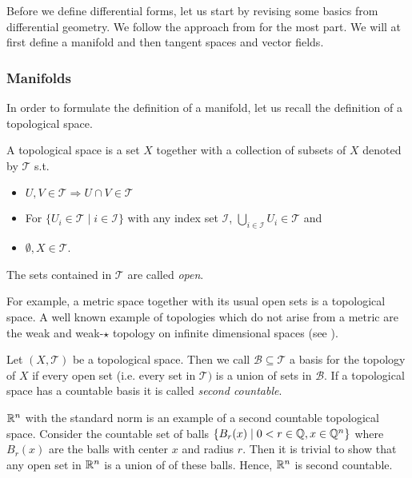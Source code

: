 \documentclass[../master_thesis.tex]{subfiles}
\begin{document}
Before we define differential forms, let us start by revising some basics
from differential geometry. We follow the approach from 
\cite[Sec. II]{topology_and_geometry} for the most part. We will at first define 
a manifold and then tangent spaces and vector fields.

\subsubsection{Manifolds}

In order to formulate the definition of a manifold, let us recall the 
definition of a topological space.
\begin{definition}
    A topological space is a set $X$ together with a collection of subsets of 
    $X$ denoted by $\mathcal{T}$ s.t.
    \begin{itemize}
        \item $U,V \in \mathcal{T} \Rightarrow U \cap V \in \mathcal{T}$
        \item For $\{ U_i \in \mathcal{T} \mid i \in \mathcal{I} \}$
            with any index set $\mathcal{I}$, 
            $\bigcup_{i\in \mathcal{I}} U_i \in \mathcal{T}$ and
        \item $\emptyset, X \in \mathcal{T}$.
    \end{itemize}
    The sets contained in $\mathcal{T}$ are called \textit{open}.
\end{definition}
For example, a metric space together with its usual open sets is a topological
space. A well known example of topologies which do not arise from a metric
are the weak and weak-$\star$ topology on infinite dimensional spaces
(see \cite[Ch.\,3]{brezis}).

\begin{definition}
    Let $(X,\mathcal{T})$ be a topological space. Then we call 
    $\mathcal{B}\subseteq \mathcal{T}$ a basis for the topology of $X$ if 
    every open set (i.e. every set in $\mathcal{T})$ is a union of sets 
    in $\mathcal{B}$. If a topological space has a countable basis it is called
    \textit{second countable}.
\end{definition}
$\mathbb{R}^n$ with the standard norm is an example of a second countable topological space. Consider 
the countable set of balls $\{ B_r(x) \mid 0 < r \in \mathbb{Q}, x \in \mathbb{Q}^n\}$
where $ B_r(x)$ are the balls with center $x$ and radius $r$.
Then it is trivial to show that any open set in $\mathbb{R}^n$ is a union of 
of these balls. Hence, $\mathbb{R}^n$ is second countable.
\end{document}
